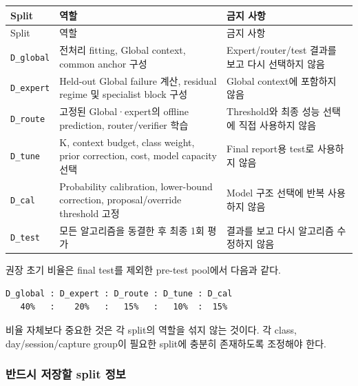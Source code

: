 \begingroup
\footnotesize
\begin{longtable}{>{\raggedright\arraybackslash}p{}>{\raggedright\arraybackslash}p{}>{\raggedright\arraybackslash}p{}}
\toprule
Split & 역할 & 금지 사항 \\ \midrule
\endfirsthead
Split & 역할 & 금지 사항 \\ \midrule
\endhead
{}\texttt{D\_\allowbreak{}\allowbreak{}global\allowbreak{}} & 전처리 fitting, Global context, common anchor 구성 & Expert/\allowbreak{}router/\allowbreak{}test 결과를 보고 다시 선택하지 않음 \\
{}\texttt{D\_\allowbreak{}\allowbreak{}expert\allowbreak{}} & Held-out Global failure 계산, residual regime 및 specialist block 구성 & Global context에 포함하지 않음 \\
{}\texttt{D\_\allowbreak{}\allowbreak{}route} & 고정된 Global·expert의 offline prediction, router/\allowbreak{}verifier 학습 & Threshold와 최종 성능 선택에 직접 사용하지 않음 \\
{}\texttt{D\_\allowbreak{}\allowbreak{}tune} & K, context budget, class weight, prior correction, cost, model capacity 선택 & Final report용 test로 사용하지 않음 \\
{}\texttt{D\_\allowbreak{}\allowbreak{}cal} & Probability calibration, lower-bound correction, proposal/\allowbreak{}override threshold 고정 & Model 구조 선택에 반복 사용하지 않음 \\
{}\texttt{D\_\allowbreak{}\allowbreak{}test} & 모든 알고리즘을 동결한 후 최종 1회 평가 & 결과를 보고 다시 알고리즘 수정하지 않음 \\
\bottomrule
\end{longtable}
\endgroup
권장 초기 비율은 final test를 제외한 pre-test pool에서 다음과 같다.


\begin{Verbatim}[breaklines=true,breakanywhere=true,fontsize=\scriptsize]
D_global : D_expert : D_route : D_tune : D_cal
   40%   :    20%   :   15%   :   10%  :  15%

\end{Verbatim}
비율 자체보다 중요한 것은 각 split의 역할을 섞지 않는 것이다. 각 class, day/\allowbreak{}session/\allowbreak{}capture group이 필요한 split에 충분히 존재하도록 조정해야 한다.

\subsubsection{반드시 저장할 split 정보}

